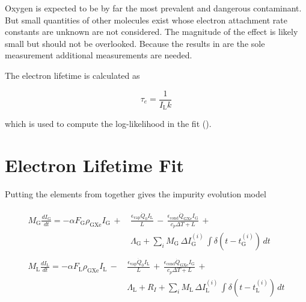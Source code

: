 Oxygen is expected to be by far the most prevalent and dangerous contaminant.  But small
quantities of other molecules exist whose electron attachment rate constants are unknown are not considered.  The magnitude of the effect
is likely small but should not be overlooked.  Because the results in  are
the sole measurement additional measurements are needed.

The electron lifetime is calculated as

\begin{equation}
\tau_e = \frac{1}{I_{\mathrm{L}} k}
\label{eq:electron_lifetime_model_field_lifetime}
\end{equation}

\noindent which is used to compute the log-likelihood in the fit ().



\section{Electron Lifetime Fit}
\label{sec:elifetime_fit}
Putting the elements from  together gives the impurity evolution model

\vspace{-20pt}

\begin{subequations}
\begin{align}
\begin{split}
M_{\mathrm{G}} \frac{dI_{\mathrm{G}}}{dt} = - \alpha F_{\mathrm{G}} \rho_{\mathrm{GXe}} I_{\mathrm{G}}\, + \,
& \frac{\epsilon_{\mathrm{vap}} \dot{Q}_0 I_{\mathrm{L}}}{L}\, - \,
\frac{\epsilon_{\mathrm{cond}} \dot{Q}_{\mathrm{GXe}} I_{\mathrm{G}}}{c_p \Delta T + L}\, + \\
& \Lambda_{\mathrm{G}} + \sum_i  M_{\mathrm{G}}\, \Delta I_{\mathrm{G}}^{(i)}\, \int \delta (t - t_{\mathrm{G}}^{(i)})\, dt
\end{split}
\\
\begin{split}
M_{\mathrm{L}} \frac{dI_{\mathrm{L}}}{dt} = -\alpha F_{\mathrm{L}} \rho_{\mathrm{GXe}} I_{\mathrm{L}}\, - \,
& \frac{\epsilon_{\mathrm{vap}} \dot{Q}_0 I_{\mathrm{L}}}{L}\, + \,
\frac{\epsilon_{\mathrm{cond}} \dot{Q}_{\mathrm{GXe}} I_{\mathrm{G}}}{c_p \Delta T + L}\, + \\
& \Lambda_{\mathrm{L}} + R_I + \sum_i  M_{\mathrm{L}}\, \Delta I_{\mathrm{L}}^{(i)}\, \int \delta (t - t_{\mathrm{L}}^{(i)})\, dt
\end{split}
\end{align}
\label{eq:elifetime_fit_model}
\end{subequations}

